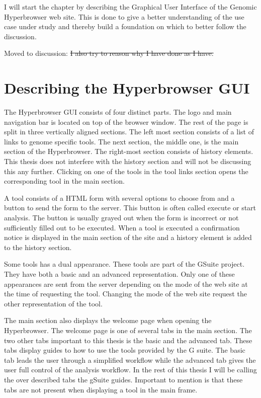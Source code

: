 \documentclass[english]{ifimaster}
\begin{document}
I will start the chapter by describing the Graphical User Interface of the Genomic Hyperbrowser web site. This is done to give a better understanding of the use case under study and thereby build a foundation on which to better follow the discussion. 

Moved to discussion: \sout{I also try to reason why I have done as I have.}
\section{Describing the Hyperbrowser GUI}
\label{sec:hyperbrowserGUI}
The Hyperbrowser GUI consists of four distinct parts. The logo and main navigation bar is located on top of the browser window. The rest of the page is split in three vertically aligned sections. The left most section consists of a list of links to genome specific tools. The next section, the middle one, is the main section of the Hyperbrowser. The right-most section consists of history elements. This thesis does not interfere with the history section and will not be discussing this any further. Clicking on one of the tools in the tool links section opens the corresponding tool in the main section. 

A tool consists of a HTML form with several options to choose from and a button to send the form to the server. This button is often called execute or start analysis. The button is usually grayed out when the form is incorrect or not sufficiently filled out to be executed. When a tool is executed a confirmation notice is displayed in the main section of the site and a history element is added to the history section.

Some tools has a dual appearance. These tools are part of the GSuite project. They have both a basic and an advanced representation. Only one of these appearances are sent from the server depending on the mode of the web site at the time of requesting the tool. Changing the mode of the web site request the other representation of the tool.

The main section also displays the welcome page when opening the Hyperbrowser. The welcome page is one of several tabs in the main section. The two other tabs important to this thesis is the basic and the advanced tab. These tabs display guides to how to use the tools provided by the G suite. The basic tab leads the user through a simplified workflow while the advanced tab gives the user full control of the analysis workflow. In the rest of this thesis I will be calling the over described tabs the gSuite guides. Important to mention is that these tabs are not present when displaying a tool in the main frame.
\end{document}

